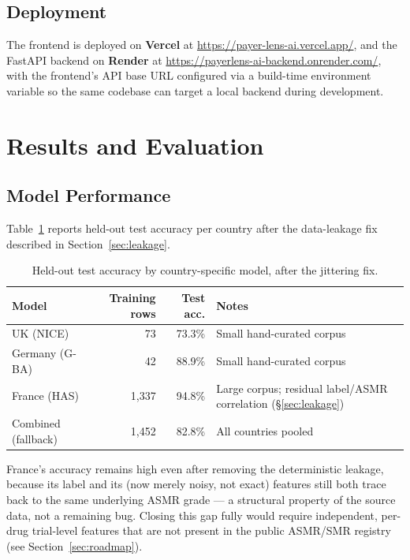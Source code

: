 \documentclass[11pt,a4paper]{article}
\begin{document}
\subsection{Deployment}
The frontend is deployed on \textbf{Vercel} at
\url{https://payer-lens-ai.vercel.app/}, and the FastAPI backend on \textbf{Render} at
\url{https://payerlens-ai-backend.onrender.com/}, with the frontend's API base URL configured via
a build-time environment variable so the same codebase can target a local backend during
development.

\section{Results and Evaluation}
\label{sec:results}

\subsection{Model Performance}
Table~\ref{tab:accuracy} reports held-out test accuracy per country after the data-leakage fix
described in Section~\ref{sec:leakage}.

\begin{table}[h]
\centering
\begin{tabularx}{\textwidth}{@{}l r r X@{}}
\toprule
\textbf{Model} & \textbf{Training rows} & \textbf{Test acc.} & \textbf{Notes} \\
\midrule
UK (NICE) & 73 & 73.3\% & Small hand-curated corpus \\
Germany (G-BA) & 42 & 88.9\% & Small hand-curated corpus \\
France (HAS) & 1,337 & 94.8\% & Large corpus; residual label/ASMR correlation (\S\ref{sec:leakage}) \\
Combined (fallback) & 1,452 & 82.8\% & All countries pooled \\
\bottomrule
\end{tabularx}
\caption{Held-out test accuracy by country-specific model, after the jittering fix.}
\label{tab:accuracy}
\end{table}

France's accuracy remains high even after removing the deterministic leakage, because its label
and its (now merely noisy, not exact) features still both trace back to the same underlying ASMR
grade --- a structural property of the source data, not a remaining bug. Closing this gap fully
would require independent, per-drug trial-level features that are not present in the public
ASMR/SMR registry (see Section~\ref{sec:roadmap}).
\end{document}
